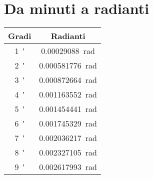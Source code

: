 \section{Da minuti a radianti}
{\centering{} 
	\begin{tabular}{cc}
		\toprule
		Gradi & Radianti \\
		\midrule
		\SI{1}{\arcminute}	&\SI[round-precision=\extralungarrotandamento,round-mode=places]{0.00029088}{\radian}  \\ 
		\SI{2}{\arcminute}&\SI[round-precision=\extralungarrotandamento,round-mode=places]{0.000581776}{\radian}  \\ 
		\SI{3}{\arcminute}&\SI[round-precision=\extralungarrotandamento,round-mode=places]{0.000872664}{\radian}  \\ 
		\SI{4}{\arcminute}&\SI[round-precision=\extralungarrotandamento,round-mode=places]{0.001163552}{\radian}  \\ 
		\SI{5}{\arcminute}&\SI[round-precision=\extralungarrotandamento,round-mode=places]{0.001454441}{\radian}  \\ 
		\SI{6}{\arcminute}&\SI[round-precision=\extralungarrotandamento,round-mode=places]{0.001745329}{\radian}  \\ 
		\SI{7}{\arcminute}&\SI[round-precision=\extralungarrotandamento,round-mode=places]{0.002036217}{\radian}  \\ 
		\SI{8}{\arcminute}&\SI[round-precision=\extralungarrotandamento,round-mode=places]{0.002327105}{\radian}  \\ 
		\SI{9}{\arcminute}&\SI[round-precision=\extralungarrotandamento,round-mode=places]{0.002617993}{\radian}  \\  
		\bottomrule
	\end{tabular}\par}
